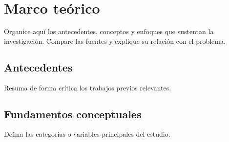\chapter{Marco teórico}
\label{cap:marco-teorico}

Organice aquí los antecedentes, conceptos y enfoques que sustentan la
investigación. Compare las fuentes y explique su relación con el problema.

\section{Antecedentes}

Resuma de forma crítica los trabajos previos relevantes.

\section{Fundamentos conceptuales}

Defina las categorías o variables principales del estudio.

